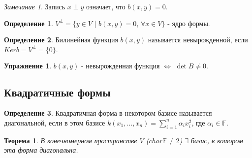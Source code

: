 \documentclass[a4paper, 12pt]{article}
\newcommand{\F}{\mathbb F}
\theoremstyle{definition}
\newtheorem*{definition}{Определение}
\newtheorem*{exercise}{Упражнение}
\theoremstyle{plain}
\newtheorem*{theorem}{Теорема}
\theoremstyle{remark}
\newtheorem*{remark}{Замечание}
\begin{document}
  \begin{remark}
    Запись $x\perp y$ означает, что $b(x,y)=0$.
  \end{remark}
  \begin{definition}
    $V^{\perp}=\{y\in V$ | $b(x,y)=0$, $\forall x\in V\}$ - ядро формы.
  \end{definition}
  \begin{definition}
    Билинейная функция $b(x,y)$ называется невырожденной, если $Kerb=V^{\perp}=\{0\}$.
  \end{definition}
  \begin{exercise}
    $b(x,y)$ - невырожденная функция $\Longleftrightarrow$ $\det B\neq0$.
  \end{exercise}
  \subsection{Квадратичные формы}
  \begin{definition}
    Квадратичная форма в некотором базисе называется диагональной, если в этом базисе $k(x_1, \ldots, x_n)=\sum\limits_{i=1}^n\alpha_ix_i^2$, где $\alpha_i\in\F$.
  \end{definition}
  \begin{theorem}
    В конечномерном пространстве $V$ ($char\F\neq2$) $\exists$ базис, в котором эта форма диагональна.
  \end{theorem}
\end{document}
